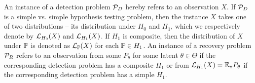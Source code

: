 An instance of a detection problem $\mathcal{P}_D$ hereby refers to an observation $X$. If $\mathcal{P}_D$ is a simple vs. simple hypothesis testing problem, then the instance $X$ takes one of two distributions -- its distribution under $H_0$ and $H_1$, which we respectively denote by $\mathcal{L}_{H_0}(X)$ and $\mathcal{L}_{H_1}(X)$. If $H_1$ is composite, then the distribution of $X$ under $\mathbb{P}$ is denoted as $\mathcal{L}_{\mathbb{P}}(X)$ for each $\mathbb{P} \in H_1$. An instance of a recovery problem $\mathcal{P}_R$ refers to an observation from some $P_\theta$ for some latent $\theta \in \Theta$ if the corresponding detection problem has a composite $H_1$ or from $\mathcal{L}_{H_1}(X) = \mathbb{E}_\pi P_\theta$ if the corresponding detection problem has a simple $H_1$.